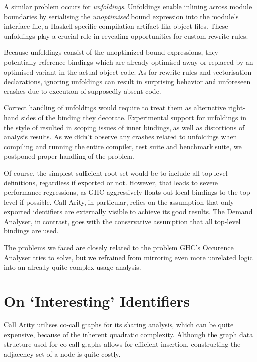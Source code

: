 A similar problem occurs for \emph{unfoldings}. 
Unfoldings enable inlining across module boundaries by serialising the \emph{unoptimised} bound expression into the module's interface file, a Haskell-specific compilation artifact like object files.
These unfoldings play a crucial role in revealing opportunities for custom rewrite rules.

Because unfoldings consist of the unoptimized bound expressions, they potentially reference bindings which are already optimised away or replaced by an optimised variant in the actual object code. 
As for rewrite rules and vectorisation declarations, ignoring unfoldings can result in surprising behavior and unforeseen crashes due to execution of supposedly absent code.

Correct handling of unfoldings would require to treat them as alternative right-hand sides of the binding they decorate.
Experimental support for unfoldings in the style of  resulted in scoping issues of inner bindings, as well as distortions of analysis results.
As we didn't observe any crashes related to unfoldings when compiling and running the entire compiler, test suite and benchmark suite, we postponed proper handling of the problem.

Of course, the simplest sufficient root set would be to include all top-level definitions, regardless if exported or not.
However, that leads to severe performance regressions, as GHC aggressively floats out local bindings to the top-level if possible. 
Call Arity, in particular, relies on the assumption that only exported identifiers are externally visible to achieve its good results.
The Demand Analyser, in contrast, goes with the conservative assumption that all top-level bindings are used.

The problems we faced are closely related to the problem GHC's Occurence Analyser tries to solve, but we refrained from mirroring even more unrelated logic into an already quite complex usage analysis.

\section{On `Interesting' Identifiers}\label{sec:int}

Call Arity utilises co-call graphs for its sharing analysis, which can be quite expensive, because of the inherent quadratic complexity. 
Although the graph data structure used for co-call graphs allows for efficient insertion, constructing the adjacency set of a node is quite costly.

